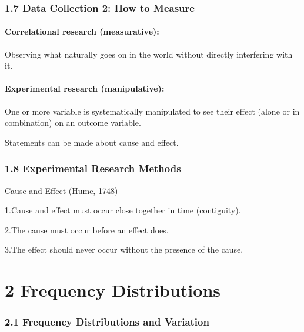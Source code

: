 \documentclass[]{article}
\let\oldparagraph\paragraph
\renewcommand{\paragraph}[1]{\oldparagraph{#1}\mbox{}}
\begin{document}
\hypertarget{data-collection-2-how-to-measure}{%
\subsubsection{1.7 Data Collection 2: How to
Measure}\label{data-collection-2-how-to-measure}}

\hypertarget{correlational-research-measurative}{%
\paragraph{Correlational research
(measurative):}\label{correlational-research-measurative}}

Observing what naturally goes on in the world without directly
interfering with it.

\hypertarget{experimental-research-manipulative}{%
\paragraph{Experimental research
(manipulative):}\label{experimental-research-manipulative}}

One or more variable is systematically manipulated to see their effect
(alone or in combination) on an outcome variable.

Statements can be made about cause and effect.

\hypertarget{experimental-research-methods}{%
\subsubsection{1.8 Experimental Research
Methods}\label{experimental-research-methods}}

Cause and Effect (Hume, 1748)

1.Cause and effect must occur close together in time (contiguity).

2.The cause must occur before an effect does.

3.The effect should never occur without the presence of the cause.

\hypertarget{frequency-distributions}{%
\section{2 Frequency Distributions}\label{frequency-distributions}}

\hypertarget{frequency-distributions-and-variation}{%
\subsubsection{2.1 Frequency Distributions and
Variation}\label{frequency-distributions-and-variation}}
\end{document}
